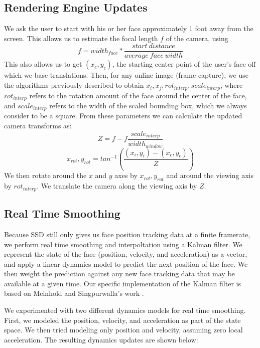 \documentclass[10pt,twocolumn,letterpaper]{article}
\begin{document}
\subsection*{Rendering Engine Updates}
We ask the user to start with his or her face approximately 1 foot away from the screen. This allows us to estimate the focal length $f$ of the camera, using
$$f = width_{face} * \frac{start\ distance}{average\ face\ width}$$
This also allows us to get $(x_c, y_c)$, the starting center point of the user's face off which we base translations.
Then, for any online image (frame capture), we use the algorithms previously described to obtain $x_i, x_j, rot_{interp}, scale_{interp}$, where $rot_{interp}$ refers to the rotation amount of the face around the center of the face, and $scale_{interp}$ refers to the width of the scaled bounding box, which we always consider to be a square. From these parameters we can calculate the updated camera transforms as:
$$Z = f - f \frac{scale_{interp}}{width_{window}}$$
$$x_{rot}, y_{rot} = tan^{-1}(\frac{(x_i,y_i)-(x_c,y_c)}{Z})$$
We then rotate around the $x$ and $y$ axes by $x_{rot}, y_{rot}$ and around the viewing axis by $rot_{interp}$. We translate the camera along the viewing axis by $Z$.

\subsection*{Real Time Smoothing}
Because SSD still only gives us face position tracking data at a finite framerate, we perform real time smoothing and interpoltation using a Kalman filter. We represent the state of the face (position, velocity, and acceleration) as a vector, and apply a linear dynamics model to predict the next position of the face. We then weight the prediction against any new face tracking data that may be available at a given time. Our specific implementation of the Kalman filter is based on Meinhold and Singpurwalla's work \cite{kalman}.

We experimented with two different dynamics models for real time smoothing. First, we modeled the position, velocity, and acceleration as part of the state space. We then tried modeling only position and velocity, assuming zero local acceleration. The resulting dynamics updates are shown below:
\end{document}
